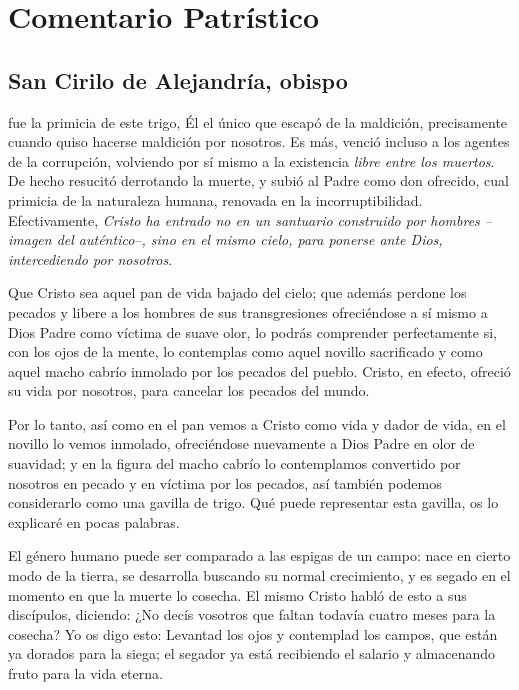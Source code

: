 \newsection
\section{Comentario Patrístico}

\subsection{San Cirilo de Alejandría, obispo}



\begin{body}
 fue la primicia de este trigo, Él el único que escapó de la maldición, precisamente cuando quiso hacerse maldición por nosotros. Es más, venció incluso a los agentes de la corrupción, volviendo por sí mismo a la existencia \textit{libre entre los muertos}. De hecho resucitó derrotando la muerte, y subió al Padre como don ofrecido, cual primicia de la naturaleza humana, renovada en la incorruptibilidad. Efectivamente, \textit{Cristo ha entrado no en un santuario construido por hombres –imagen del auténtico–, sino en el mismo cielo, para ponerse ante Dios, intercediendo por nosotros}.

Que Cristo sea aquel pan de vida bajado del cielo; que además perdone los pecados y libere a los hombres de sus transgresiones ofreciéndose a sí mismo a Dios Padre como víctima de suave olor, lo podrás comprender perfectamente si, con los ojos de la mente, lo contemplas como aquel novillo sacrificado y como aquel macho cabrío inmolado por los pecados del pueblo. Cristo, en efecto, ofreció su vida por nosotros, para cancelar los pecados del mundo.

Por lo tanto, así como en el pan vemos a Cristo como vida y dador de vida, en el novillo lo vemos inmolado, ofreciéndose nuevamente a Dios Padre en olor de suavidad; y en la figura del macho cabrío lo contemplamos convertido por nosotros en pecado y en víctima por los pecados, así también podemos considerarlo como una gavilla de trigo. Qué puede representar esta gavilla, os lo explicaré en pocas palabras.

El género humano puede ser comparado a las espigas de un campo: nace en cierto modo de la tierra, se desarrolla buscando su normal crecimiento, y es segado en el momento en que la muerte lo cosecha. El mismo Cristo habló de esto a sus discípulos, diciendo: ¿No decís vosotros que faltan todavía cuatro meses para la cosecha? Yo os digo esto: Levantad los ojos y contemplad los campos, que están ya dorados para la siega; el segador ya está recibiendo el salario y almacenando fruto para la vida eterna.


\end{body}
